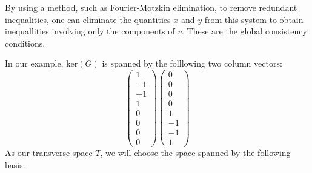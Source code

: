 By using a method, such as Fourier-Motzkin elimination, to remove redundant inequalities, one can eliminate the quantities $x$ and $y$ from this
system to obtain inequallities involving only the components of $v$.
These are the global consistency conditions.

In our example, $\mathrm{ker}(G)$ is spanned by the folllowing two
column vectors:
\begin{equation}
 \begin{pmatrix}
 1 \\ -1 \\ -1 \\ 1 \\ 0 \\ 0 \\ 0 \\ 0
 \end{pmatrix}
 \begin{pmatrix}
 0 \\ 0 \\ 0 \\ 0 \\ 1 \\ -1 \\ -1 \\ 1
 \end{pmatrix}
\end{equation}
As our transverse space $T$, we will choose the space spanned by the
following basis:
